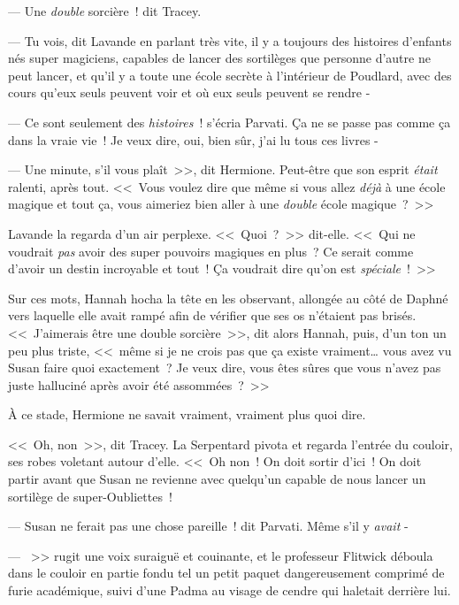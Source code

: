--- Une \emph{double} sorcière~! dit Tracey.

--- Tu vois, dit Lavande en parlant très vite, il y a toujours des histoires d'enfants nés super magiciens, capables de lancer des sortilèges que personne d'autre ne peut lancer, et qu'il y a toute une école secrète à l'intérieur de Poudlard, avec des cours qu'eux seuls peuvent voir et où eux seuls peuvent se rendre -

--- Ce sont seulement des \emph{histoires}~! s'écria Parvati. Ça ne se passe pas comme ça dans la vraie vie~! Je veux dire, oui, bien sûr, j'ai lu tous ces livres -

--- Une minute, s'il vous plaît~>>, dit Hermione. Peut-être que son esprit \emph{était} ralenti, après tout. <<~Vous voulez dire que même si vous allez \emph{déjà} à une école magique et tout ça, vous aimeriez bien aller à une \emph{double} école magique~?~>>

Lavande la regarda d'un air perplexe. <<~Quoi~?~>> dit-elle. <<~Qui ne voudrait \emph{pas} avoir des super pouvoirs magiques en plus~? Ce serait comme d'avoir un destin incroyable et tout~! Ça voudrait dire qu'on est \emph{spéciale}~!~>>

Sur ces mots, Hannah hocha la tête en les observant, allongée au côté de Daphné vers laquelle elle avait rampé afin de vérifier que ses os n'étaient pas brisés. <<~J'aimerais être une double sorcière~>>, dit alors Hannah, puis, d'un ton un peu plus triste, <<~même si je ne crois pas que ça existe vraiment… vous avez vu Susan faire quoi exactement~? Je veux dire, vous êtes sûres que vous n'avez pas juste halluciné après avoir été assommées~?~>>

À ce stade, Hermione ne savait vraiment, vraiment plus quoi dire.

<<~Oh, non~>>, dit Tracey. La Serpentard pivota et regarda l'entrée du couloir, ses robes voletant autour d'elle. <<~Oh non~! On doit sortir d'ici~! On doit partir avant que Susan ne revienne avec quelqu'un capable de nous lancer un sortilège de super-Oubliettes~!

--- Susan ne ferait pas une chose pareille~! dit Parvati. Même s'il y \emph{avait} -

--- ~>> rugit une voix suraiguë et couinante, et le professeur Flitwick déboula dans le couloir en partie fondu tel un petit paquet dangereusement comprimé de furie académique, suivi d'une Padma au visage de cendre qui haletait derrière lui.

\later

